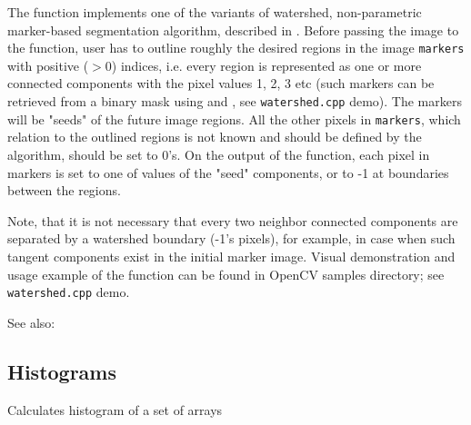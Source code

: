 The function implements one of the variants
of watershed, non-parametric marker-based segmentation algorithm,
described in \cite{Meyer92}. Before passing the image to the
function, user has to outline roughly the desired regions in the image
\texttt{markers} with positive ($>0$) indices, i.e. every region is
represented as one or more connected components with the pixel values
1, 2, 3 etc (such markers can be retrieved from a binary mask
using and , see \texttt{watershed.cpp} demo).
The markers will be "seeds" of the future image
regions. All the other pixels in \texttt{markers}, which relation to the
outlined regions is not known and should be defined by the algorithm,
should be set to 0's. On the output of the function, each pixel in
markers is set to one of values of the "seed" components, or to -1 at
boundaries between the regions.

Note, that it is not necessary that every two neighbor connected
components are separated by a watershed boundary (-1's pixels), for
example, in case when such tangent components exist in the initial
marker image. Visual demonstration and usage example of the function
can be found in OpenCV samples directory; see \texttt{watershed.cpp} demo.

See also: 


\subsection{Histograms}

\label{calcHist}
Calculates histogram of a set of arrays

